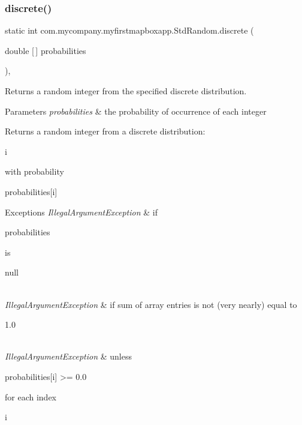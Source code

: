 \subsubsection{\texorpdfstring{discrete()}{discrete()}\hspace{0.1cm}{\footnotesize\ttfamily [1/2]}}
{\footnotesize\ttfamily static int com.\+mycompany.\+myfirstmapboxapp.\+Std\+Random.\+discrete (\begin{DoxyParamCaption}\item[{double \mbox{[}$\,$\mbox{]}}]{probabilities }\end{DoxyParamCaption})\hspace{0.3cm}{\ttfamily [inline]}, {\ttfamily [static]}}

Returns a random integer from the specified discrete distribution.


\begin{DoxyParams}{Parameters}
{\em probabilities} & the probability of occurrence of each integer \\
\hline
\end{DoxyParams}
\begin{DoxyReturn}{Returns}
a random integer from a discrete distribution\+: 
\begin{DoxyCode}
i 
\end{DoxyCode}
 with probability
\begin{DoxyCode}
probabilities[i] 
\end{DoxyCode}
 
\end{DoxyReturn}

\begin{DoxyExceptions}{Exceptions}
{\em Illegal\+Argument\+Exception} & if
\begin{DoxyCode}
probabilities 
\end{DoxyCode}
 is
\begin{DoxyCode}
null 
\end{DoxyCode}
 \\
\hline
{\em Illegal\+Argument\+Exception} & if sum of array entries is not (very nearly) equal to
\begin{DoxyCode}
1.0 
\end{DoxyCode}
 \\
\hline
{\em Illegal\+Argument\+Exception} & unless
\begin{DoxyCode}
probabilities[i] >= 0.0 
\end{DoxyCode}
 for each index
\begin{DoxyCode}
i 
\end{DoxyCode}
 \\
\hline
\end{DoxyExceptions}
\mbox{\label{classcom_1_1mycompany_1_1myfirstmapboxapp_1_1_std_random_a0dfb1912ed6ef49c7bccdde1c0efd08a}} 
